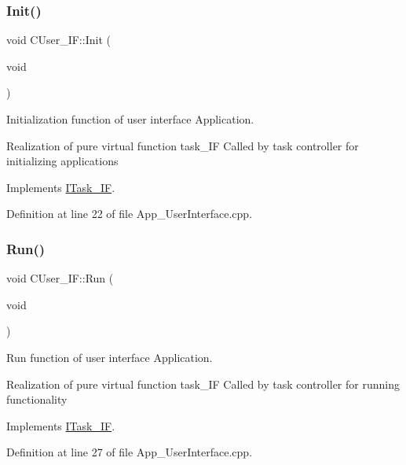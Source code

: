 \subsubsection{\texorpdfstring{Init()}{Init()}}
{\footnotesize\ttfamily void C\+User\+\_\+\+I\+F\+::\+Init (\begin{DoxyParamCaption}\item[{void}]{ }\end{DoxyParamCaption})\hspace{0.3cm}{\ttfamily [virtual]}}



Initialization function of user interface Application. 

Realization of pure virtual function task\+\_\+\+IF Called by task controller for initializing applications 

Implements \mbox{\hyperlink{class_i_task___i_f_a28f608bdb9b19658403f7b9b7421968d}{I\+Task\+\_\+\+IF}}.



Definition at line 22 of file App\+\_\+\+User\+Interface.\+cpp.

\mbox{\label{class_c_user___i_f_a1be2e11cd5df5ad0fa5a74a0eb283ec5}} 
\subsubsection{\texorpdfstring{Run()}{Run()}}
{\footnotesize\ttfamily void C\+User\+\_\+\+I\+F\+::\+Run (\begin{DoxyParamCaption}\item[{void}]{ }\end{DoxyParamCaption})\hspace{0.3cm}{\ttfamily [virtual]}}



Run function of user interface Application. 

Realization of pure virtual function task\+\_\+\+IF Called by task controller for running functionality 

Implements \mbox{\hyperlink{class_i_task___i_f_ab73cc5879a61d00fc59b72cce32cc6f7}{I\+Task\+\_\+\+IF}}.



Definition at line 27 of file App\+\_\+\+User\+Interface.\+cpp.

\mbox{\label{class_c_user___i_f_ae241b3296f4dd7810897ed8631ede880}} 
